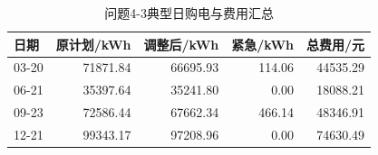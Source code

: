 \begin{table}[H]
\centering\small
\caption{问题4-3典型日购电与费用汇总}
\label{tab:q4_3_daily_summary}
\begin{tabular}{lrrrr}\toprule
日期 & 原计划/kWh & 调整后/kWh & 紧急/kWh & 总费用/元 \\\midrule
03-20 & 71871.84 & 66695.93 & 114.06 & 44535.29 \\
06-21 & 35397.64 & 35241.80 & 0.00 & 18088.21 \\
09-23 & 72586.44 & 67662.34 & 466.14 & 48346.91 \\
12-21 & 99343.17 & 97208.96 & 0.00 & 74630.49 \\
\bottomrule\end{tabular}
\end{table}
